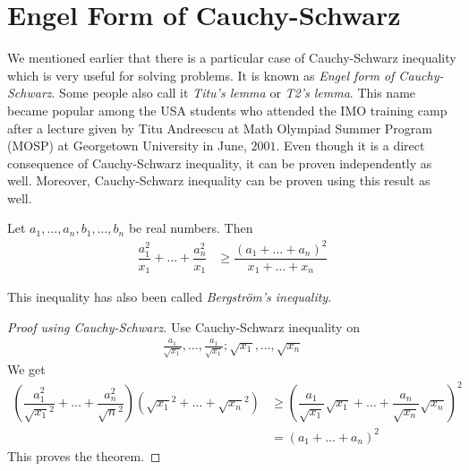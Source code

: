 \documentclass{subfile}
\begin{document}
	\section{Engel Form of Cauchy-Schwarz}\label{sec:engel}
	We mentioned earlier that there is a particular case of Cauchy-Schwarz inequality which is very useful for solving problems. It is known as \emph{Engel form of Cauchy-Schwarz}. Some people also call it \emph{Titu's lemma} or \emph{T2's lemma}. This name became popular among the USA students who attended the IMO training camp after a lecture given by Titu Andreescu at Math Olympiad Summer Program (MOSP) at Georgetown University in June, $2001$. Even though it is a direct consequence of Cauchy-Schwarz inequality, it can be proven independently as well. Moreover, Cauchy-Schwarz inequality can be proven using this result as well.
		\begin{theorem}\label{thm:engel}
			Let $a_1,\ldots,a_n,b_1,\ldots,b_n$ be real numbers. Then
				\begin{align}
					\dfrac{a_1^2}{x_1}+\ldots+\dfrac{a_n^2}{x_1}
						& \geq\dfrac{(a_1+\ldots+a_n)^2}{x_1+\ldots+x_n}\label{ineq:engel}
				\end{align}
		\end{theorem}
	This inequality has also been called \emph{Bergstr\"{o}m's inequality}. 
		\begin{proof}[Proof using Cauchy-Schwarz]
			Use Cauchy-Schwarz inequality on
				\begin{align*}
					\frac{a_1}{\sqrt{x_1}},\ldots,\frac{a_1}{\sqrt{x_1}};\sqrt{x_1},\ldots,\sqrt{x_n}
				\end{align*}
			We get
				\begin{align*}
					\left(\dfrac{a_1^2}{\sqrt{x_1}^2}+\ldots+\dfrac{a_n^2}{\sqrt{n}^2}\right)\left(\sqrt{x_1}^2+\ldots+\sqrt{x_n}^2\right)
						& \geq\left(\dfrac{a_1}{\sqrt{x_1}}\sqrt{x_1}+\ldots+\dfrac{a_n}{\sqrt{x_n}}\sqrt{x_n}\right)^2\\
						& = (a_1+\ldots+a_n)^2
				\end{align*}
			This proves the theorem.
		\end{proof}
	
\end{document}
